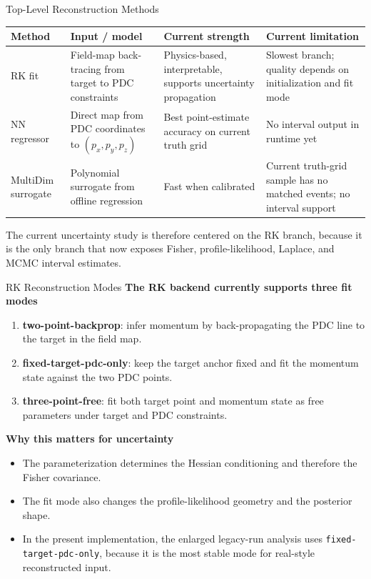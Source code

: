 \documentclass[aspectratio=169]{beamer}
\begin{document}
\begin{frame}{Top-Level Reconstruction Methods}
\small
\begin{table}
\centering
\begin{tabular}{p{}p{}p{}p{}}
\toprule
Method & Input / model & Current strength & Current limitation \\
\midrule
RK fit & Field-map back-tracing from target to PDC constraints & Physics-based, interpretable, supports uncertainty propagation & Slowest branch; quality depends on initialization and fit mode \\
NN regressor & Direct map from PDC coordinates to \((p_x,p_y,p_z)\) & Best point-estimate accuracy on current truth grid & No interval output in runtime yet \\
MultiDim surrogate & Polynomial surrogate from offline regression & Fast when calibrated & Current truth-grid sample has no matched events; no interval support \\
\bottomrule
\end{tabular}
\end{table}

\vspace{0.1cm}
The current uncertainty study is therefore centered on the RK branch, because it is the only branch that now exposes Fisher, profile-likelihood, Laplace, and MCMC interval estimates.
\end{frame}

\begin{frame}{RK Reconstruction Modes}
\small
\textbf{The RK backend currently supports three fit modes}
\begin{enumerate}
\item \textbf{two-point-backprop}: infer momentum by back-propagating the PDC line to the target in the field map.
\item \textbf{fixed-target-pdc-only}: keep the target anchor fixed and fit the momentum state against the two PDC points.
\item \textbf{three-point-free}: fit both target point and momentum state as free parameters under target and PDC constraints.
\end{enumerate}

\vspace{0.2cm}
\textbf{Why this matters for uncertainty}
\begin{itemize}
\item The parameterization determines the Hessian conditioning and therefore the Fisher covariance.
\item The fit mode also changes the profile-likelihood geometry and the posterior shape.
\item In the present implementation, the enlarged legacy-run analysis uses \texttt{fixed-target-pdc-only}, because it is the most stable mode for real-style reconstructed input.
\end{itemize}
\end{frame}
\end{document}
